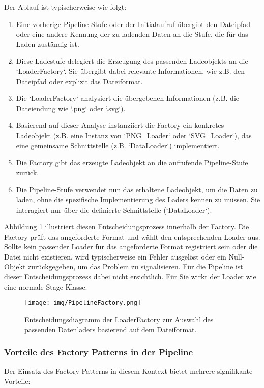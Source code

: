 \documentclass[a4paper]{article} %
\begin{document}
Der Ablauf ist typischerweise wie folgt:
\begin{enumerate}
    \item Eine vorherige Pipeline-Stufe oder der Initialaufruf übergibt den Dateipfad oder eine andere Kennung der zu ladenden Daten an die Stufe, die für das Laden zuständig ist.
    \item Diese Ladestufe delegiert die Erzeugung des passenden Ladeobjekts an die `LoaderFactory`. Sie übergibt dabei relevante Informationen, wie z.B. den Dateipfad oder explizit das Dateiformat.
    \item Die `LoaderFactory` analysiert die übergebenen Informationen (z.B. die Dateiendung wie `.png` oder `.svg`).
    \item Basierend auf dieser Analyse instanziiert die Factory ein konkretes Ladeobjekt (z.B. eine Instanz von `PNG\_Loader` oder `SVG\_Loader`), das eine gemeinsame Schnittstelle (z.B. `DataLoader`) implementiert.
    \item Die Factory gibt das erzeugte Ladeobjekt an die aufrufende Pipeline-Stufe zurück.
    \item Die Pipeline-Stufe verwendet nun das erhaltene Ladeobjekt, um die Daten zu laden, ohne die spezifische Implementierung des Laders kennen zu müssen. Sie interagiert nur über die definierte Schnittstelle (`DataLoader`).
\end{enumerate}

Abbildung \ref{fig:loaderFactory} illustriert diesen Entscheidungsprozess innerhalb der Factory. Die Factory prüft das angeforderte Format und wählt den entsprechenden Loader aus. Sollte kein passender Loader für das angeforderte Format registriert sein oder die Datei nicht existieren, wird typischerweise ein Fehler ausgelöst oder ein Null-Objekt zurückgegeben, um das Problem zu signalisieren.
Für die Pipeline ist dieser Entscheidungsprozess dabei nicht ersichtlich. Für Sie wirkt der Loader wie eine normale Stage Klasse.

\begin{figure}[htbp] %
    \centering %
    \texttt{[image: img/PipelineFactory.png]} %
    \caption{Entscheidungsdiagramm der LoaderFactory zur Auswahl des passenden Datenladers basierend auf dem Dateiformat.} %
    \label{fig:loaderFactory} %
\end{figure}

\subsubsection{Vorteile des Factory Patterns in der Pipeline}
Der Einsatz des Factory Patterns in diesem Kontext bietet mehrere signifikante Vorteile:
\end{document}
